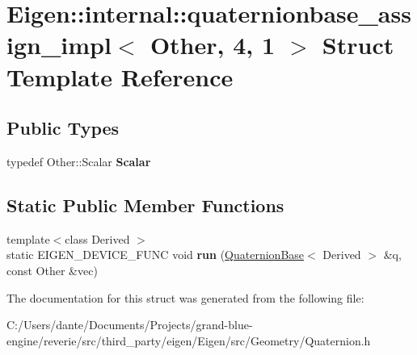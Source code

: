 \hypertarget{struct_eigen_1_1internal_1_1quaternionbase__assign__impl_3_01_other_00_014_00_011_01_4}{}\section{Eigen\+::internal\+::quaternionbase\+\_\+assign\+\_\+impl$<$ Other, 4, 1 $>$ Struct Template Reference}
\label{struct_eigen_1_1internal_1_1quaternionbase__assign__impl_3_01_other_00_014_00_011_01_4}
\subsection*{Public Types}
\begin{DoxyCompactItemize}
\item 
\mbox{\label{struct_eigen_1_1internal_1_1quaternionbase__assign__impl_3_01_other_00_014_00_011_01_4_ac30752718f970b7ba76e0fcceb30bf49}} 
typedef Other\+::\+Scalar {\bfseries Scalar}
\end{DoxyCompactItemize}
\subsection*{Static Public Member Functions}
\begin{DoxyCompactItemize}
\item 
\mbox{\label{struct_eigen_1_1internal_1_1quaternionbase__assign__impl_3_01_other_00_014_00_011_01_4_a95a77633cabbb3f056d8869d37319163}} 
{\footnotesize template$<$class Derived $>$ }\\static E\+I\+G\+E\+N\+\_\+\+D\+E\+V\+I\+C\+E\+\_\+\+F\+U\+NC void {\bfseries run} (\mbox{\hyperlink{class_eigen_1_1_quaternion_base}{Quaternion\+Base}}$<$ Derived $>$ \&q, const Other \&vec)
\end{DoxyCompactItemize}


The documentation for this struct was generated from the following file\+:\begin{DoxyCompactItemize}
\item 
C\+:/\+Users/dante/\+Documents/\+Projects/grand-\/blue-\/engine/reverie/src/third\+\_\+party/eigen/\+Eigen/src/\+Geometry/Quaternion.\+h\end{DoxyCompactItemize}
